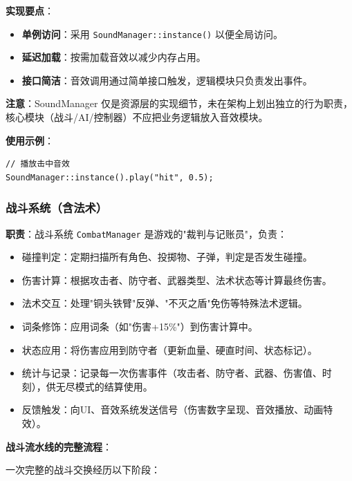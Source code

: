 ﻿\documentclass[utf8]{ctexart}
\begin{document}
\textbf{实现要点}：

\begin{itemize}
  \item \textbf{单例访问}：采用 \texttt{SoundManager::instance()} 以便全局访问。
  \item \textbf{延迟加载}：按需加载音效以减少内存占用。
  \item \textbf{接口简洁}：音效调用通过简单接口触发，逻辑模块只负责发出事件。
\end{itemize}

\textbf{注意}：SoundManager 仅是资源层的实现细节，未在架构上划出独立的行为职责，核心模块（战斗/AI/控制器）不应把业务逻辑放入音效模块。

\textbf{使用示例}：
\begin{verbatim}
// 播放击中音效
SoundManager::instance().play("hit", 0.5);
\end{verbatim}

\subsubsection{战斗系统（含法术）}

\textbf{职责}：战斗系统 \texttt{CombatManager} 是游戏的"裁判与记账员"，负责：

\begin{itemize}
  \item 碰撞判定：定期扫描所有角色、投掷物、子弹，判定是否发生碰撞。
  \item 伤害计算：根据攻击者、防守者、武器类型、法术状态等计算最终伤害。
  \item 法术交互：处理"铜头铁臂"反弹、"不灭之盾"免伤等特殊法术逻辑。
  \item 词条修饰：应用词条（如"伤害+15\%"）到伤害计算中。
  \item 状态应用：将伤害应用到防守者（更新血量、硬直时间、状态标记）。
  \item 统计与记录：记录每一次伤害事件（攻击者、防守者、武器、伤害值、时刻），供无尽模式的结算使用。
  \item 反馈触发：向UI、音效系统发送信号（伤害数字呈现、音效播放、动画特效）。
\end{itemize}

\textbf{战斗流水线的完整流程}：

一次完整的战斗交换经历以下阶段：
\end{document}
